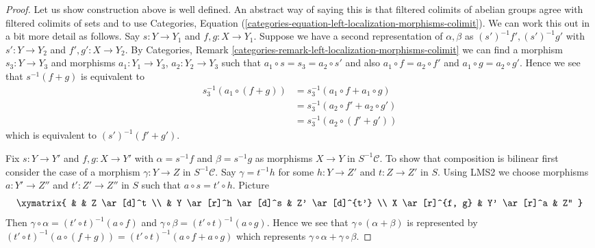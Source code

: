 \begin{proof}
\medskip\noindent
Let us show construction above is well defined.
An abstract way of saying this is that filtered colimits of
abelian groups agree with filtered colimits of sets and to use
Categories,
Equation (\ref{categories-equation-left-localization-morphisms-colimit}).
We can work this out in a bit more detail as follows.
Say $s : Y \to Y_1$ and $f, g : X \to Y_1$. Suppose we have a second
representation of $\alpha, \beta$ as $(s')^{-1}f', (s')^{-1}g'$ with
$s' : Y \to Y_2$ and $f', g' : X \to Y_2$. By
Categories, Remark \ref{categories-remark-left-localization-morphisms-colimit}
we can find a morphism $s_3 : Y \to Y_3$ and morphisms
$a_1 : Y_1 \to Y_3$, $a_2 : Y_2 \to Y_3$ such that
$a_1 \circ s = s_3 = a_2 \circ s'$ and also
$a_1 \circ f = a_2 \circ f'$ and $a_1 \circ g = a_2 \circ g'$.
Hence we see that $s^{-1}(f + g)$ is equivalent to
\begin{align*}
s_3^{-1}(a_1 \circ (f + g)) & =
s_3^{-1}(a_1 \circ f + a_1 \circ g) \\
& = s_3^{-1}(a_2 \circ f' + a_2 \circ g') \\
& = s_3^{-1}(a_2 \circ (f' + g'))
\end{align*}
which is equivalent to $(s')^{-1}(f' + g')$.

\medskip\noindent
Fix $s : Y \to Y'$ and $f, g : X \to Y'$ with
$\alpha = s^{-1}f$ and $\beta = s^{-1}g$ as morphisms $X \to Y$
in $S^{-1}\mathcal{C}$.
To show that composition is bilinear first consider the case of a
morphism $\gamma : Y \to Z$ in $S^{-1}\mathcal{C}$. Say $\gamma = t^{-1}h$
for some $h : Y \to Z'$ and $t : Z \to Z'$ in $S$. Using LMS2 we
choose morphisms $a : Y' \to Z''$ and $t' : Z' \to Z''$ in $S$ such
that $a \circ s = t' \circ h$. Picture
$$
\xymatrix{
& & Z \ar[d]^t \\
& Y \ar[r]^h \ar[d]^s & Z' \ar[d]^{t'} \\
X \ar[r]^{f, g} & Y' \ar[r]^a & Z''
}
$$
Then
$\gamma \circ \alpha = (t' \circ t)^{-1}(a \circ f)$ and
$\gamma \circ \beta = (t' \circ t)^{-1}(a \circ g)$.
Hence we see that $\gamma \circ (\alpha + \beta)$ is represented
by $(t' \circ t)^{-1}(a \circ (f + g)) =
(t' \circ t)^{-1}(a \circ f + a \circ g)$ which represents
$\gamma \circ \alpha + \gamma \circ \beta$.


\end{proof}
